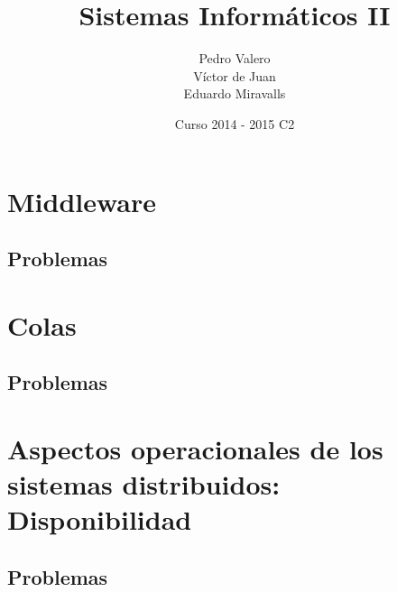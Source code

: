 \documentclass{apuntes}
\title{Sistemas Informáticos II}
\author{Pedro Valero \\ Víctor de Juan \\ Eduardo Miravalls}
\date{Curso 2014 - 2015 C2}
\begin{document}
\newpage
\tableofcontents


\chapter{Middleware}

\newpage
\section{Problemas}



\chapter{Colas}
\section{Problemas}



\chapter{Aspectos operacionales de los sistemas distribuidos: Disponibilidad}

\newpage
\section{Problemas}


\printindex
\end{document}
